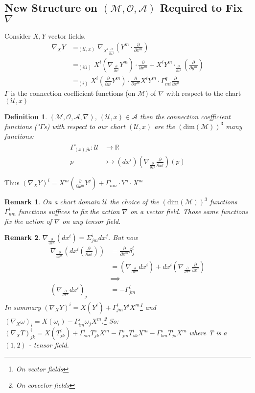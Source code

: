 \documentclass[10pt, oneside]{article}
\newcommand{\R}{\mathbb{R}}
\newcommand{\M}{\mathcal{M}}
\newtheorem{defn}{Definition}
\newtheorem{remark}{Remark}
\begin{document}
  \subsection{New Structure on $(\M, \mathcal{O}, \mathcal{A})$ Required to Fix $\nabla$}
     Consider $X,Y$ vector fields.
     \begin{align*}
        \nabla_X Y &=_{(\mathcal{U},x)} \nabla_{X^i \frac{\partial}{\partial x^i}} (Y^m \cdot \frac{\partial}{\partial x^m}) \\
        &=_{(iii)} X^i (\nabla_{\frac{\partial}{\partial x^i}} Y^m) \cdot \frac{\partial}{\partial x^m} + X^i Y^m \cdot_{\frac{\partial}{\partial x^i}}(\frac{\partial}{\partial y^m}) \\
        &=_{(i)} X^i (\frac{\partial}{\partial x^i} Y^m) \cdot \frac{\partial}{\partial x^m} X^i Y^m \cdot \Gamma^q_{m i} \frac{\partial}{\partial x^q}
     \end{align*}
     $\Gamma$ is the connection coefficient functions (on $\M$) of $\nabla$ with respect to the chart $(\mathcal{U},x)$
     \begin{defn}
        $(\M,\mathcal{O},\mathcal{A},\nabla)$, $(\mathcal{U},x) \in \mathcal{A}$ then the connection coefficient functions ("$\Gamma$s) with respect to our chart $(\mathcal{U},x)$ are the $(\text{dim}(\M))^3$ many functions:
        \begin{align*}
           \Gamma_(x)^i_{jk}: \mathcal{U} &\to \R \\
           p & \rightarrowtail (dx^i)(\nabla_{\frac{\partial}{\partial x^k}} \frac{\partial}{\partial x^j})(p)
        \end{align*}
     \end{defn}
     Thus $(\nabla_X Y)^i = X^m (\frac{\partial}{\partial x^m} Y^j)+\Gamma^i_{nm} \cdot Y^n \cdot X^m$
     \begin{remark}
        On a chart domain $\mathcal{U}$ the choice of the $(\text{dim}(\M))^3$ functions $\Gamma^i_{n m}$ functions suffices to fix the action $\nabla$ on a vector field. Those same functions fix the action of $\nabla$ on any tensor field.
     \end{remark}
     \begin{remark}
        $\nabla_{\frac{\partial}{\partial x^m}} (dx^i) = \Sigma^i_{jm} dx^j$. But now
        \begin{align*}
           \nabla_{\frac{\partial}{\partial x^m}}(dx^i(\frac{\partial}{\partial x^j})) &= \frac{\partial}{\partial x^m} \delta^i_j \\
           &= (\nabla_{\frac{\partial}{\partial x^m}} dx^i) + dx^i (\nabla_{\frac{\partial}{\partial x^m}} \frac{\partial}{\partial x^j}) \\
           & \implies \\
           (\nabla_{\frac{\partial}{\partial x^m}} dx^i)_j &= - \Gamma^i_{jm}
        \end{align*}
        In summary $(\nabla_X Y)^i = X ( Y ^i) + \Gamma^i_{jm} Y^j X^m$\footnote{On vector fields} and $(\nabla_X \omega)_i = X(\omega_i) - \Gamma^j_{im} \omega_j X^m$.\footnote{On covector fields}
        So: $(\nabla_X T)^i_{jk} = X(T^i_{jk})+\Gamma^i_{sm} T^s_{jk} X^m - \Gamma^s_{jm} T^i_{sk} X^m - \Gamma^s_{km} T^i_{js} X^m$ where T is a $(1,2)$ - tensor field.
      \end{remark}
\end{document}
